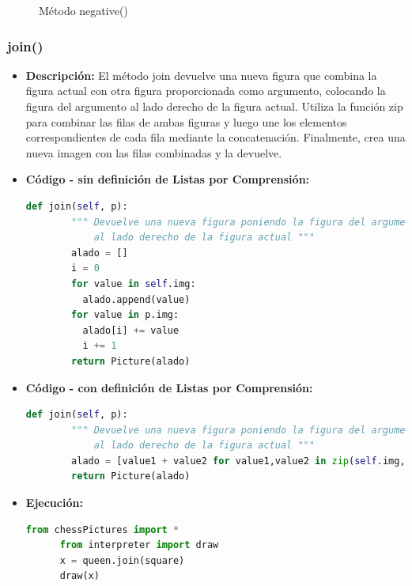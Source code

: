 \documentclass{article}
\begin{document}
\begin{itemize}
\begin{figure}[H]
      \caption{Método negative()}
    \end{figure}
  \end{itemize}
  

  \subsubsection{join()}
  \begin{itemize}
    \item \textbf{Descripción: }El método join devuelve una nueva figura que combina la figura actual 
      con otra figura proporcionada como argumento, colocando la figura del argumento al lado derecho de la figura actual. 
      Utiliza la función zip para combinar las filas de ambas figuras y luego une los elementos correspondientes de cada fila 
      mediante la concatenación. Finalmente, crea una nueva imagen con las filas combinadas y la devuelve.
    \item \textbf{Código - sin definición de Listas por Comprensión:}
    \begin{lstlisting}[language=Python, caption=Método join()]
      def join(self, p):
        """ Devuelve una nueva figura poniendo la figura del argumento 
            al lado derecho de la figura actual """
        alado = []
        i = 0
        for value in self.img:
          alado.append(value)
        for value in p.img:
          alado[i] += value
          i += 1
        return Picture(alado)
    \end{lstlisting}
    \newpage
    \item \textbf{Código - con definición de Listas por Comprensión:}
    \begin{lstlisting}[language=Python, caption=Método join()]
      def join(self, p):
        """ Devuelve una nueva figura poniendo la figura del argumento 
            al lado derecho de la figura actual """
        alado = [value1 + value2 for value1,value2 in zip(self.img,p.img)]
        return Picture(alado)
    \end{lstlisting}
    \item \textbf{Ejecución:}
    \begin{lstlisting}[language=Python, caption=Prueba de join()]
      from chessPictures import *
      from interpreter import draw
      x = queen.join(square)
      draw(x)
    \end{lstlisting}
    \begin{figure}[H]
      \centering

\end{figure}
\end{itemize}
\end{document}
